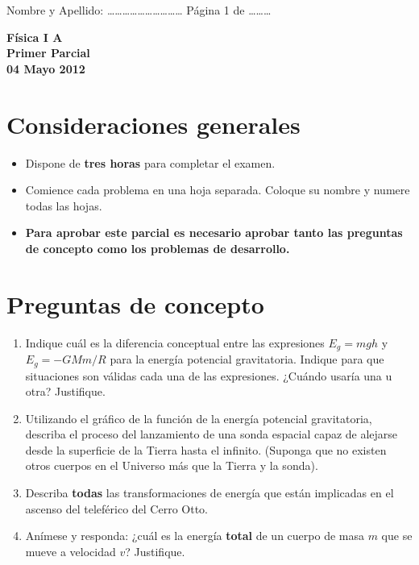 \documentclass[a4paper,12pt]{article}
\begin{document}
\pagestyle{empty}
Nombre y Apellido: \ldots\ldots\ldots\ldots\ldots\ldots\ldots\ldots\ldots\ldots
Página 1 de \ldots\ldots\ldots \begin{center}
{\Large {\bf{Física I A}}} \\
\bigskip
{\large {\bf{Primer Parcial}}} \\ {\bf{04 Mayo 2012}} \\
\end{center}

\section{Consideraciones generales}

\begin{itemize}
\item Dispone de {\bf{tres horas}} para completar el examen.
\item Comience cada problema en una hoja separada. Coloque su nombre y
numere todas las hojas.  
\item {\bf{Para aprobar este parcial es necesario aprobar tanto las
preguntas de concepto como los problemas de desarrollo.}} 
\end{itemize}

\section{Preguntas de concepto}

\begin{enumerate}
\item Indique cuál es la diferencia conceptual entre las expresiones
$E_g=mgh$ y $E_g = -G M m / R$ para la energía potencial gravitatoria.
Indique para que situaciones son válidas cada una de las expresiones. ¿Cuándo usaría una u otra?
Justifique.
\item Utilizando el gráfico de la función de la energía potencial
gravitatoria, describa el proceso del lanzamiento de una sonda espacial
capaz de alejarse desde la superficie de la Tierra hasta el infinito.
(Suponga que no existen otros cuerpos en el Universo más que la Tierra
y la sonda).
\item Describa {\bf{todas}} las transformaciones de energía que están
implicadas en el ascenso del teleférico del Cerro Otto.
\item Anímese y responda: ¿cuál es la energía {\bf{total}} de un cuerpo de masa $m$ que se mueve a velocidad $v$? Justifique.
\end{enumerate}
\end{document}
